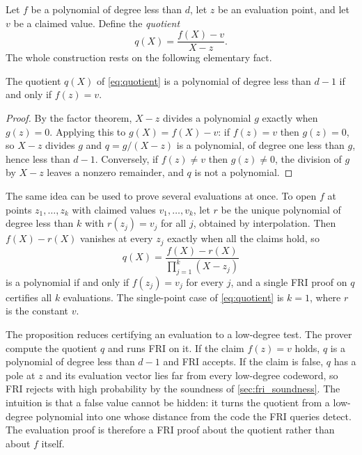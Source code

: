 Let $f$ be a polynomial of degree less than $d$, let $z$ be an evaluation
point, and let $v$ be a claimed value. Define the \emph{quotient}
%
\begin{equation}
\label{eq:quotient}
q(X) = \frac{f(X) - v}{X - z}.
\end{equation}
%
The whole construction rests on the following elementary fact.

\begin{proposition}
\label{prop:quotient}
The quotient $q(X)$ of \cref{eq:quotient} is a polynomial of degree less
than $d - 1$ if and only if $f(z) = v$.
\end{proposition}

\begin{proof}
By the factor theorem, $X - z$ divides a polynomial $g$ exactly when
$g(z) = 0$. Applying this to $g(X) = f(X) - v$: if $f(z) = v$ then
$g(z) = 0$, so $X - z$ divides $g$ and $q = g/(X-z)$ is a polynomial, of
degree one less than $g$, hence less than $d - 1$. Conversely, if
$f(z) \neq v$ then $g(z) \neq 0$, the division of $g$ by $X - z$ leaves a
nonzero remainder, and $q$ is not a polynomial.
\end{proof}

\begin{remark}
\label{rem:batch_open}
The same idea can be used to prove several evaluations at once. To open $f$ at points
$z_1, \ldots, z_k$ with claimed values $v_1, \ldots, v_k$, let $r$ be the
unique polynomial of degree less than $k$ with $r(z_j) = v_j$ for all
$j$, obtained by interpolation. Then $f(X) - r(X)$ vanishes at every
$z_j$ exactly when all the claims hold, so
%
\[
q(X) = \frac{f(X) - r(X)}{\prod_{j=1}^{k} (X - z_j)}
\]
%
is a polynomial if and only if $f(z_j) = v_j$ for every $j$, and a single
FRI proof on $q$ certifies all $k$ evaluations. The single-point case of
\cref{eq:quotient} is $k = 1$, where $r$ is the constant $v$.
\end{remark}


The proposition reduces certifying an evaluation to a low-degree test.
The prover compute the quotient $q$ and runs FRI on it. If the claim
$f(z) = v$ holds, $q$ is a polynomial of degree less than $d - 1$ and FRI
accepts. If the claim is false, $q$ has a pole at $z$ and its evaluation
vector lies far from every low-degree codeword, so FRI rejects with high
probability by the soundness of \cref{sec:fri_soundness}. The intuition
is that a false value cannot be hidden: it turns the quotient from a
low-degree polynomial into one whose distance from the code the FRI
queries detect. The evaluation proof is therefore a FRI proof about the
quotient rather than about $f$ itself.


